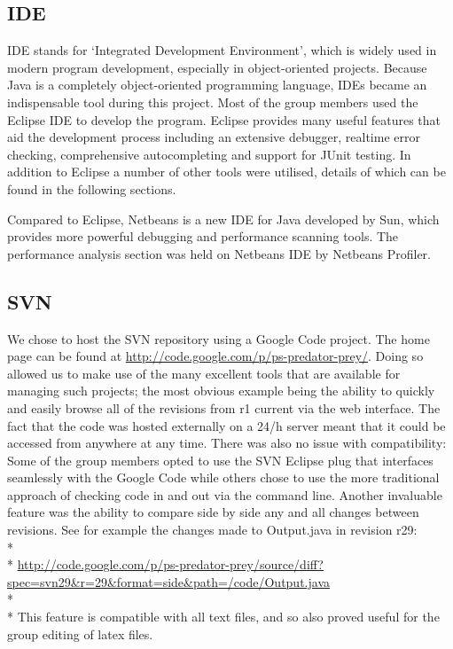 \documentclass[11pt]{report}
\begin{document}
   	 
	 \subsection{IDE}
	 
	 IDE stands for `Integrated Development Environment', which is widely used in modern program development, especially in object-oriented projects. Because Java is a completely object-oriented programming language, IDEs became an indispensable tool during this project.
Most of the group members used the Eclipse IDE to develop the program. Eclipse provides many useful features that aid the development process including an extensive debugger, 
realtime error checking, comprehensive autocompleting and support for JUnit testing. In addition to Eclipse a number of other tools were utilised, details of which can be found in the following sections.\newline{}

Compared to Eclipse, Netbeans is a new IDE for Java developed by Sun, which provides more powerful debugging and performance scanning tools. The performance analysis section was held on Netbeans IDE by Netbeans Profiler.  
     
     
      \subsection{SVN} %
      
	We chose to host the SVN repository using a Google Code project. The home page can be found at \href{http://code.google.com/p/ps-predator-prey/}{http://code.google.com/p/ps-predator-prey/}. Doing so allowed us to make use of the many excellent tools that are available for managing such projects; the most obvious example being the ability to quickly and easily browse all of the revisions from r1 current via the web interface.  The fact that the code was hosted externally on a 24/h server meant that it could be accessed from anywhere at any time. There was also no issue with compatibility: Some of the group members opted to use the SVN Eclipse plug that interfaces seamlessly with the Google Code while others chose to use the more traditional approach of checking code in and out via the command line. Another invaluable feature was the ability to compare side by side any and all changes between revisions. See for example the changes made to Output.java in revision r29:\\* \\*
	 \href{http://code.google.com/p/ps-predator-prey/source/diff?spec=svn29&r=29&format=side&path=/code/Output.java}{http://code.google.com/p/ps-predator-prey/source/diff?spec=svn29&r=29&format=side&path=/code/Output.java} \\* \\*
	 This feature is compatible with all text files, and so also proved useful for the group editing of latex files.	   
 
\end{document}
